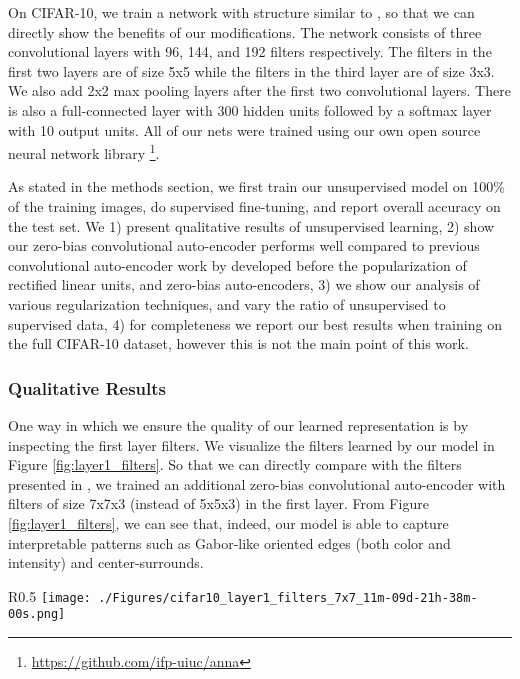 \documentclass{article} \usepackage{iclr2015,times}
\begin{document}
On CIFAR-10, we train a network with structure similar to \citet{masci2011stacked}, so that we can directly show the benefits of our modifications. The network consists of three convolutional layers with 96, 144, and 192 filters respectively. The filters in the first two layers are of size 5x5 while the filters in the third layer are of size 3x3. We also add 2x2 max pooling layers after the first two convolutional layers. There is also a full-connected layer with 300 hidden units followed by a softmax layer with 10 output units. All of our nets were trained using our own open source neural network library \footnote{\url{https://github.com/ifp-uiuc/anna}}.

As stated in the methods section, we first train our unsupervised model on 100\% of the training images, do supervised fine-tuning, and report overall accuracy on the test set. We 1) present qualitative results of unsupervised learning, 2) show our zero-bias convolutional auto-encoder performs well compared to previous convolutional auto-encoder work by \citet{masci2011stacked} developed before the popularization of rectified linear units, and zero-bias auto-encoders, 3) we show our analysis of various regularization techniques, and vary the ratio of unsupervised to supervised data, 4) for completeness we report our best results when training on the full CIFAR-10 dataset, however this is not the main point of this work.

\subsubsection{Qualitative Results}
One way in which we ensure the quality of our learned representation is by inspecting the first layer filters. We visualize the filters learned by our model in Figure \ref{fig:layer1_filters}. So that we can directly compare with the filters presented in \citet{masci2011stacked}, we trained an additional zero-bias convolutional auto-encoder with filters of size 7x7x3 (instead of 5x5x3) in the first layer. From Figure \ref{fig:layer1_filters}, we can see that, indeed, our model is able to capture interpretable patterns such as Gabor-like oriented edges (both color and intensity) and center-surrounds.

\begin{wrapfigure}{R}{0.5\textwidth}
\centering
\texttt{[image: ./Figures/cifar10\_layer1\_filters\_7x7\_11m-09d-21h-38m-00s.png]}
\caption{First layer filters learned by our zero-bias convolutional auto-encoder. Each filter has dimension 7x7x3. (Best viewed in color.) For direct comparison with tanh CAE please see \citet{masci2011stacked} Figure 2c.}
\label{fig:layer1_filters}
\vspace{-0.5cm}
\end{wrapfigure}
\end{document}

